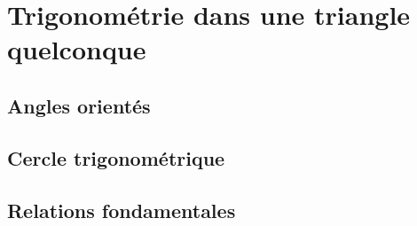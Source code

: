 \documentclass[
  a4paper,
  oneside]{book}
\begin{document}
\chapter{Trigonométrie dans une triangle
quelconque}\label{trigonomuxe9trie-dans-une-triangle-quelconque}

\section{Angles orientés}\label{angles-orientuxe9s}

\section{Cercle trigonométrique}\label{cercle-trigonomuxe9trique}

\section{Relations fondamentales}\label{relations-fondamentales}


\backmatter
\end{document}
